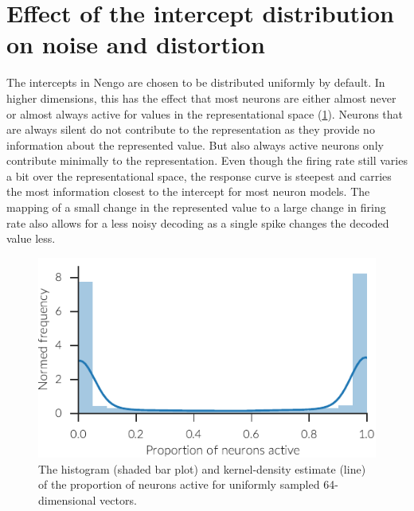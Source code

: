 \section{Effect of the intercept distribution on noise and distortion}
The intercepts in Nengo are chosen to be distributed uniformly by default.
In higher dimensions, this has the effect that most neurons are either almost never or almost always active for values in the representational space (\cref{fig:act-proportion}).
Neurons that are always silent do not contribute to the representation as they provide no information about the represented value.
But also always active neurons only contribute minimally to the representation.
Even though the firing rate still varies a bit over the representational space, the response curve is steepest and carries the most information closest to the intercept for most neuron models.
The mapping of a small change in the represented value to a large change in firing rate also allows for a less noisy decoding as a single spike changes the decoded value less.
\begin{figure}
    \centering
    \includegraphics{figures/act-proportion}
    \caption[Distribution of the proportion of active neurons]{The histogram (shaded bar plot) and kernel-density estimate (line) of the proportion of neurons active for uniformly sampled 64-dimensional vectors.}\label{fig:act-proportion}
\end{figure}

